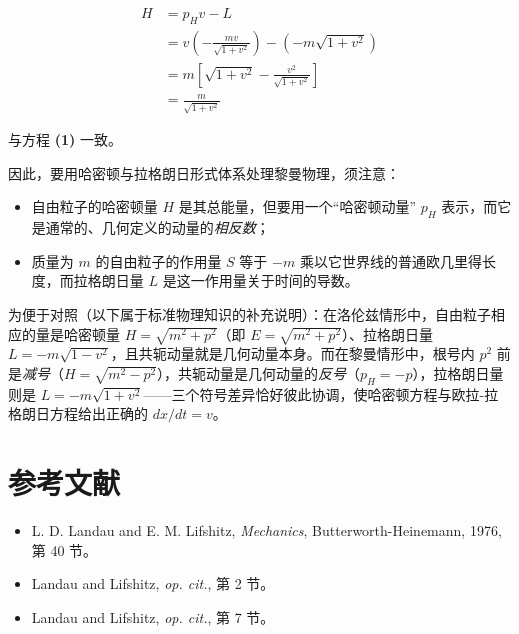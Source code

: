 \begin{equation}
\begin{aligned}
H &= p_{H}v - L\\
&= v\left(-\frac{mv}{\sqrt{1+v^{2}}}\right) - \left(-m\sqrt{1+v^{2}}\right)\\
&= m\left[\sqrt{1+v^{2}} - \frac{v^{2}}{\sqrt{1+v^{2}}}\right]\\
&= \frac{m}{\sqrt{1+v^{2}}}
\end{aligned}
\tag{20}
\end{equation}

与方程 \textbf{(1)} 一致。

因此，要用哈密顿与拉格朗日形式体系处理黎曼物理，须注意：

\begin{itemize}
  \item 自由粒子的哈密顿量 $H$ 是其总能量，但要用一个“哈密顿动量” $p_{H}$ 表示，而它是通常的、几何定义的动量的\emph{相反数}；
  \item 质量为 $m$ 的自由粒子的作用量 $S$ 等于 $-m$ 乘以它世界线的普通欧几里得长度，而拉格朗日量 $L$ 是这一作用量关于时间的导数。
\end{itemize}

\begin{notebox}[补充：与洛伦兹情形的符号差异]
为便于对照（以下属于标准物理知识的补充说明）：在洛伦兹情形中，自由粒子相应的量是哈密顿量 $H=\sqrt{m^{2}+p^{2}}$（即 $E=\sqrt{m^{2}+p^{2}}$）、拉格朗日量 $L=-m\sqrt{1-v^{2}}$，且共轭动量就是几何动量本身。而在黎曼情形中，根号内 $p^{2}$ 前是\emph{减号}（$H=\sqrt{m^{2}-p^{2}}$），共轭动量是几何动量的\emph{反号}（$p_{H}=-p$），拉格朗日量则是 $L=-m\sqrt{1+v^{2}}$——三个符号差异恰好彼此协调，使哈密顿方程与欧拉-拉格朗日方程给出正确的 $dx/dt=v$。
\end{notebox}

\section{参考文献}

\begin{itemize}
  \item [1] L. D. Landau and E. M. Lifshitz, \emph{Mechanics}, Butterworth-Heinemann, 1976, 第 40 节。
  \item [2] Landau and Lifshitz, \emph{op. cit.}, 第 2 节。
  \item [3] Landau and Lifshitz, \emph{op. cit.}, 第 7 节。
\end{itemize}
